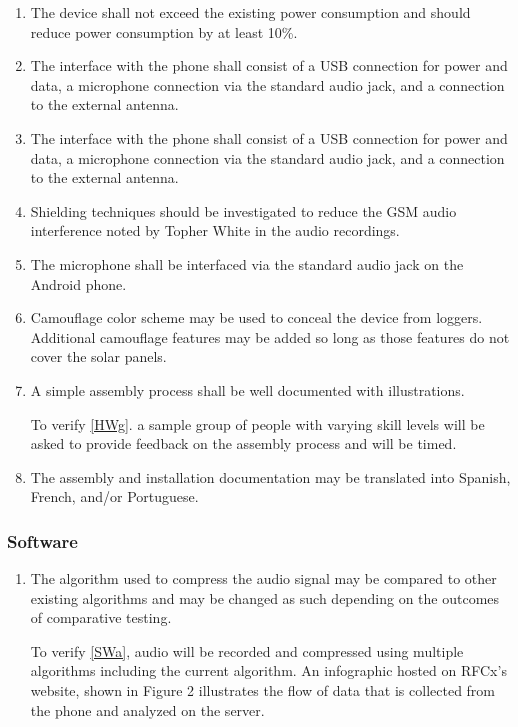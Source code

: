 \documentclass{article}
\begin{document}
{\begin{enumerate}[align=left,leftmargin=*, labelindent= 0em, label=\textbf{Requirement \thesubsubsection.\arabic*.}, itemindent=0em]
\item \label{HWa} The device shall not exceed the existing power consumption and should reduce power consumption by at least 10\%.
\item \label{HWb} The interface with the phone shall consist of a USB connection for power and data, a microphone connection via the standard audio jack, and a connection to the external antenna.
\item \label{HWc} The interface with the phone shall consist of a USB connection for power and data, a microphone connection via the standard audio jack, and a connection to the external antenna.
\item \label{HWd} Shielding techniques should be investigated to reduce the GSM audio interference noted by Topher White in the audio recordings.
\item \label{HWe} The microphone shall be interfaced via the standard audio jack on the Android phone.
\item \label{HWf} Camouflage color scheme may be used to conceal the device from loggers.  Additional camouflage features may be added so long as those features do not cover the solar panels.
\item \label{HWg} A simple assembly process shall be well documented with illustrations.

\baselinestretch
To verify \ref{HWg}. a sample group of people with varying skill levels will be asked to provide feedback on the assembly process and will be timed.

\item \label{HWh} The assembly and installation documentation may be translated into Spanish, French, and/or Portuguese.
\end{enumerate}
\subsubsection{Software}
\begin{enumerate}[align=left,leftmargin=*, labelindent= 0em, label=\textbf{Requirement \thesubsubsection.\arabic*.}, itemindent=0em]
\item \label{SWa} The algorithm used to compress the audio signal may be compared to other existing algorithms and may be changed as such depending on the outcomes of comparative testing.

\baselinestretch
To verify \ref{SWa}, audio will be recorded and compressed using multiple algorithms including the current algorithm. An infographic hosted on RFCx’s website, shown in Figure 2 illustrates the flow of data that is collected from the phone and analyzed on the server.
\end{enumerate}

}
\end{document}
